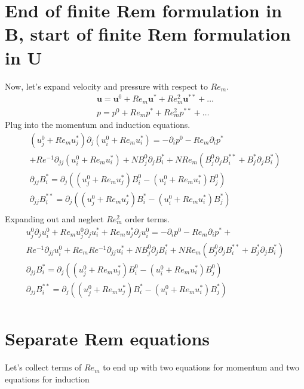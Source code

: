 \documentclass[11pt]{article}
\newcommand{\U}{\mathbf{u}}
\newcommand{\PD}{\partial}
\begin{document}
\section{End of finite Rem formulation in B, start of finite Rem formulation in U}
Now, let's expand velocity and pressure with respect to $Re_m$.
\begin{equation}\begin{aligned}
	\U = \U^0 + Re_m \U^* + Re_m^2 \U^{**} + \hdots \\
	p = p^0 + Re_m p^* + Re_m^2 p^{**} + \hdots
\end{aligned} \end{equation}
Plug into the momentum and induction equations.
\begin{equation}\begin{aligned}
(u_j^0+Re_m u_j^*)\PD_j (u_i^0+Re_m u_i^*) =-\PD_i p^0-Re_m\PD_i p^* \\ + Re^{-1} \PD_{jj} (u_i^0+Re_m u_i^*) + N B_j^0 \PD_j B_i^* + N Re_m ( B_j^0 \PD_j B_i^{**} + B_j^* \PD_j B_i^* ) \\
\PD_{jj} B_i^{*}  = \PD_j ((u_j^0+Re_m u_j^*) B_i^{0} - (u_i^0+Re_m u_i^*) B_j^{0}) \\
\PD_{jj} B_i^{**} = \PD_j ((u_j^0+Re_m u_j^*) B_i^{*} - (u_i^0+Re_m u_i^*) B_j^{*}) \\
\end{aligned}\end{equation}
Expanding out and neglect $Re_m^2$ order terms.
\begin{equation}\boxed{\begin{aligned}
u_j^0 \PD_j u_i^0 + Re_m u_j^0 \PD_j u_i^* + Re_m u_j^* \PD_j u_i^0 = -\PD_i p^0 - Re_m\PD_i p^*+  \\
Re^{-1} \PD_{jj} u_i^0 + Re_m Re^{-1} \PD_{jj} u_i^*
+ N B_j^0 \PD_j B_i^* + N Re_m ( B_j^0 \PD_j B_i^{**} + B_j^* \PD_j B_i^* )
\\
\PD_{jj} B_i^{*}  = \PD_j ((u_j^0+Re_m u_j^*) B_i^{0} - (u_i^0+Re_m u_i^*) B_j^{0}) \\
\PD_{jj} B_i^{**} = \PD_j ((u_j^0+Re_m u_j^*) B_i^{*} - (u_i^0+Re_m u_i^*) B_j^{*}) \\
\end{aligned}}\end{equation}


\section{Separate Rem equations}

Let's collect terms of $Re_m$ to end up with two equations for momentum and two equations for induction
\end{document}
